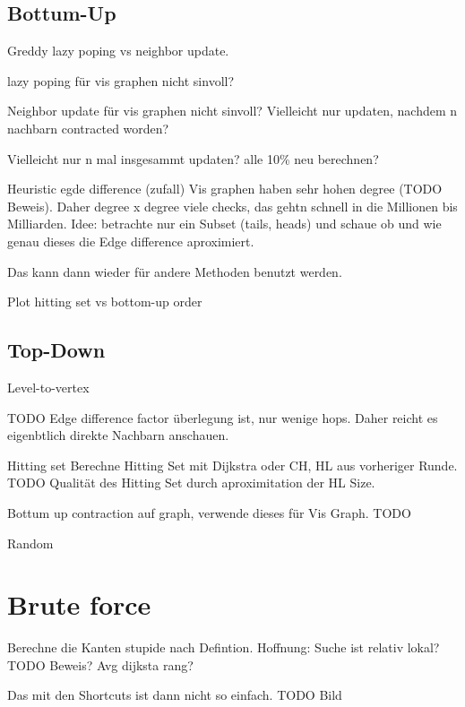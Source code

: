 \subsection{Bottum-Up}

Greddy lazy poping vs neighbor update.

lazy poping für vis graphen nicht sinvoll?

Neighbor update für vis graphen nicht sinvoll?
Vielleicht nur updaten, nachdem n nachbarn contracted worden?

Vielleicht nur n mal insgesammt updaten? alle 10\% neu berechnen?



Heuristic egde difference (zufall)
Vis graphen haben sehr hohen degree (TODO Beweis).
Daher degree x degree viele checks, das gehtn schnell in die Millionen bis Milliarden.
Idee: betrachte nur ein Subset (tails, heads) und schaue ob und wie genau dieses die Edge difference aproximiert.

Das kann dann wieder für andere Methoden benutzt werden.

Plot hitting set vs bottom-up order


\subsection{Top-Down}

Level-to-vertex

TODO Edge difference factor
überlegung ist, nur wenige hops. Daher reicht es eigenbtlich direkte Nachbarn anschauen.

Hitting set
Berechne Hitting Set mit Dijkstra oder CH, HL aus vorheriger Runde.
TODO Qualität des Hitting Set durch aproximitation der HL Size.

Bottum up contraction auf graph, verwende dieses für Vis Graph.
TODO

Random


\section{Brute force}

Berechne die Kanten stupide nach Defintion. Hoffnung: Suche ist relativ lokal? TODO Beweis? Avg dijksta rang?

Das mit den Shortcuts ist dann nicht so einfach. TODO Bild

